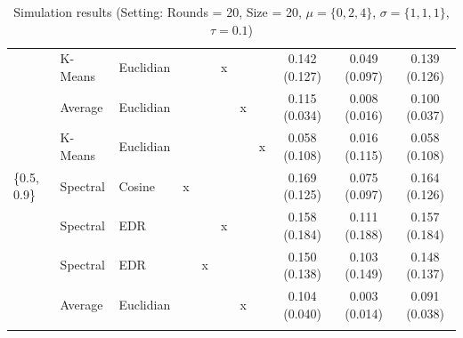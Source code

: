 \documentclass[12pt,a4paper,bibliography=totocnumbered,listof=totocnumbered]{scrartcl}
\begin{document}
\begin{appendix}
\begin{table}[!htbp]
\begin{tabularx}{\textwidth}{ lllcccccccc}
& K-Means & Euclidian &  &  & x &  &  & 0.142 (0.127) & 0.049 (0.097) & 0.139 (0.126) \\ 
& Average & Euclidian &  &  &  & x &  & 0.115 (0.034) & 0.008 (0.016) & 0.100 (0.037) \\ 
& K-Means & Euclidian &  &  &  &  & x & 0.058 (0.108) & 0.016 (0.115) & 0.058 (0.108) \\ 
\{0.5, 0.9\} & Spectral & Cosine & x &  &  &  &  & 0.169 (0.125) & 0.075 (0.097) & 0.164 (0.126) \\ 
& Spectral & EDR &  &  & x &  &  & 0.158 (0.184) & 0.111 (0.188) & 0.157 (0.184) \\ 
& Spectral & EDR &  & x &  &  &  & 0.150 (0.138) & 0.103 (0.149) & 0.148 (0.137) \\ 
& Average & Euclidian &  &  &  & x &  & 0.104 (0.040) & 0.003 (0.014) & 0.091 (0.038) \\ 
\hline \\[-1.8ex] 
	\end{tabularx} 
	\caption{Simulation results (Setting: Rounds = 20, Size = 20, $\mu = \{0,2,4\}$, $\sigma =  \{1,1,1\}$, $\tau = 0.1$)} 
\end{table} 


\end{appendix}
\end{document}
